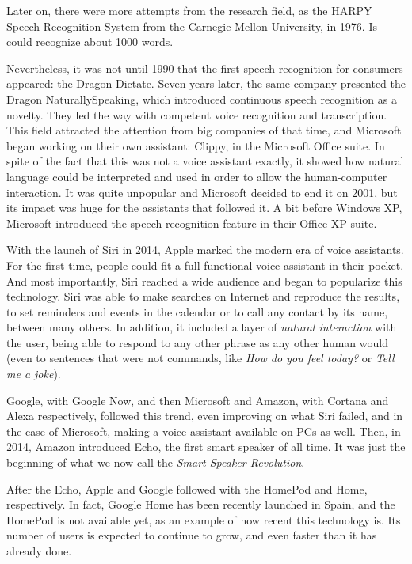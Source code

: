 Later on, there were more attempts from the research field, as the HARPY Speech Recognition System from the Carnegie
Mellon University, in 1976.\cite{lowerre76} Is could recognize about 1000 words.

Nevertheless, it was not until 1990 that the first speech recognition for consumers appeared: the Dragon Dictate. Seven years
later, the same company presented the Dragon NaturallySpeaking, which introduced continuous speech recognition as a novelty.
They led the way with competent voice recognition and transcription. This field attracted the attention from big companies of that
time, and Microsoft began working on their own assistant: Clippy, in the Microsoft Office suite. In spite of the fact that this was
not a voice assistant exactly, it showed how natural language could be interpreted and used in order to allow the human-computer
interaction. It was quite unpopular and Microsoft decided to end it on 2001, but its impact was huge for the assistants that followed
it. A bit before Windows XP, Microsoft introduced the speech recognition feature in their Office XP suite.

With the launch of Siri in 2014, Apple marked the modern era of voice assistants. For the first time, people could fit a full functional
voice assistant in their pocket. And most importantly, Siri reached a wide audience and began to popularize this technology.
Siri was able to make searches on Internet and reproduce the results, to set reminders and events in the calendar or to call any
contact by its name, between many others. In addition, it included a layer of \textit{natural interaction} with the user, being able to
respond to any other phrase as any other human would (even to sentences that were not commands, like \textit{How do you feel
today?} or \textit{Tell me a joke}).

Google, with Google Now, and then Microsoft and Amazon, with Cortana and Alexa respectively, followed this trend, even improving
on what Siri failed, and in the case of Microsoft, making a voice assistant available on PCs as well. Then, in 2014, Amazon introduced
Echo, the first smart speaker of all time. It was just the beginning of what we now call the \textit{Smart Speaker Revolution}.\cite{voicebotTimeline}

After the Echo, Apple and Google followed with the HomePod and Home, respectively. In fact, Google Home has been recently
launched in Spain, and the HomePod is not available yet, as an example of how recent this technology is. Its number of users is
expected to continue to grow, and even faster than it has already done.\cite{statistaDigitalAssistants}

